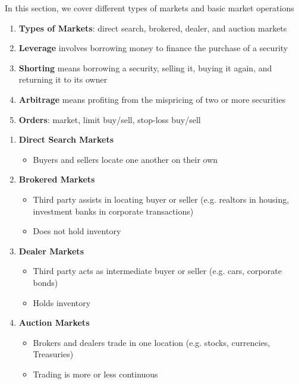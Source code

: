 \documentclass{beamer}
\begin{document}
\begin{frame}{}
	In this section, we cover different types of markets and basic market operations
	\begin{enumerate}
		\item\textbf{Types of Markets}: direct search, brokered, dealer, and auction markets
		\item\textbf{Leverage} involves borrowing money to finance the purchase of a security
		\item\textbf{Shorting} means borrowing a security, selling it, buying it again, and returning it to its owner
		\item\textbf{Arbitrage} means profiting from the mispricing of two or more securities
		\item\textbf{Orders}: market, limit buy/sell, stop-loss buy/sell
	\end{enumerate}
\end{frame}

\begin{frame}{}
	\begin{enumerate}
		\item \textbf{Direct Search Markets}
		\begin{itemize}
			\item Buyers and sellers locate one another on their own 
		\end{itemize}
			\item \textbf{Brokered Markets}
		\begin{itemize}
			\item Third party assists in locating buyer or seller (e.g. realtors in housing, investment banks in corporate transactions)
			\item Does not hold inventory
		\end{itemize}
		\item \textbf{Dealer Markets}
		\begin{itemize}
			\item Third party acts as intermediate buyer or seller (e.g. cars, corporate bonds)
			\item Holds inventory
		\end{itemize}
		\item \textbf{Auction Markets}
		\begin{itemize}
			\item Brokers and dealers trade in one location (e.g. stocks, currencies, Treasuries)
			\item Trading is more or less continuous
		\end{itemize}
	\end{enumerate}
\end{frame}
\end{document}
